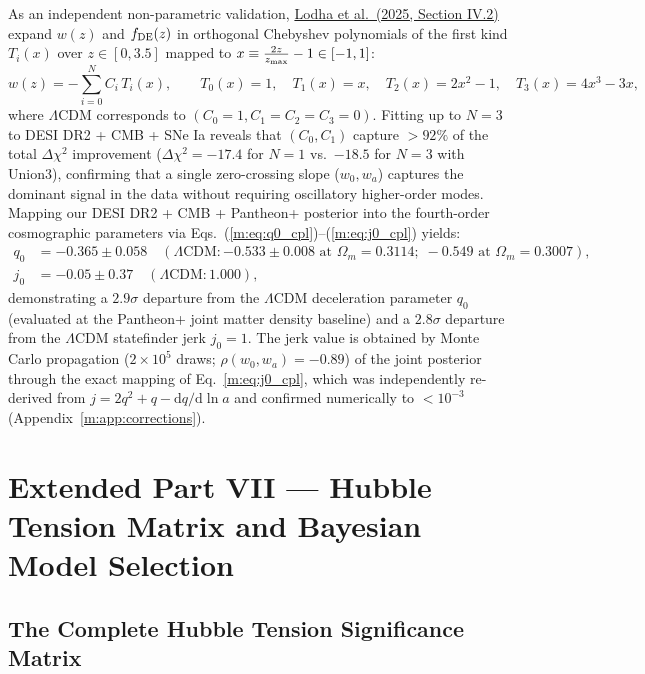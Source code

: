 \documentclass[aps,prd,preprint,superscriptaddress,nofootinbib]{revtex4-2}
\begin{document}
As an independent non-parametric validation, \href{https://arxiv.org/abs/2503.14743}{Lodha et al.\ (2025, Section IV.2)} expand $w(z)$ and $f_{\rm DE}(z)$ in orthogonal Chebyshev polynomials of the first kind $T_i(x)$ over $z \in [0, 3.5]$ mapped to $x \equiv \frac{2z}{z_{\rm max}} - 1 \in [-1, 1]$:
\begin{equation}
    w(z) = -\sum_{i=0}^N C_i\, T_i(x), \qquad T_0(x) = 1,\quad T_1(x) = x,\quad T_2(x) = 2x^2 - 1,\quad T_3(x) = 4x^3 - 3x,
    \label{m:eq:chebyshev}
\end{equation}
where $\Lambda$CDM corresponds to $(C_0 = 1, C_1 = C_2 = C_3 = 0)$. Fitting up to $N=3$ to DESI DR2 + CMB + SNe Ia reveals that $(C_0, C_1)$ capture $>92\%$ of the total $\Delta\chi^2$ improvement ($\Delta\chi^2 = -17.4$ for $N=1$ vs.\ $-18.5$ for $N=3$ with Union3), confirming that a single zero-crossing slope ($w_0, w_a$) captures the dominant signal in the data without requiring oscillatory higher-order modes. Mapping our DESI DR2 + CMB + Pantheon+ posterior into the fourth-order cosmographic parameters via Eqs.~(\ref{m:eq:q0_cpl})--(\ref{m:eq:j0_cpl}) yields:
\begin{equation}
\begin{aligned}
    q_0 &= -0.365 \pm 0.058 \quad (\Lambda\text{CDM}: -0.533 \pm 0.008 \text{ at } \Omega_m = 0.3114;\; -0.549 \text{ at } \Omega_m = 0.3007), \\[4pt]
    j_0 &= -0.05 \pm 0.37 \quad (\Lambda\text{CDM}: 1.000),
\end{aligned}
    \label{m:eq:cosmography_results}
\end{equation}
demonstrating a $2.9\sigma$ departure from the $\Lambda$CDM deceleration parameter $q_0$ (evaluated at the Pantheon+ joint matter density baseline) and a $2.8\sigma$ departure from the $\Lambda$CDM statefinder jerk $j_0 = 1$. The jerk value is obtained by Monte Carlo propagation ($2\times10^5$ draws; $\rho(w_0, w_a) = -0.89$) of the joint posterior through the exact mapping of Eq.~\ref{m:eq:j0_cpl}, which was independently re-derived from $j = 2q^2 + q - \mathrm{d}q/\mathrm{d}\ln a$ and confirmed numerically to $< 10^{-3}$ (Appendix~\ref{m:app:corrections}).

\section{Extended Part VII --- Hubble Tension Matrix and Bayesian Model Selection}

\subsection{The Complete Hubble Tension Significance Matrix}
\end{document}

